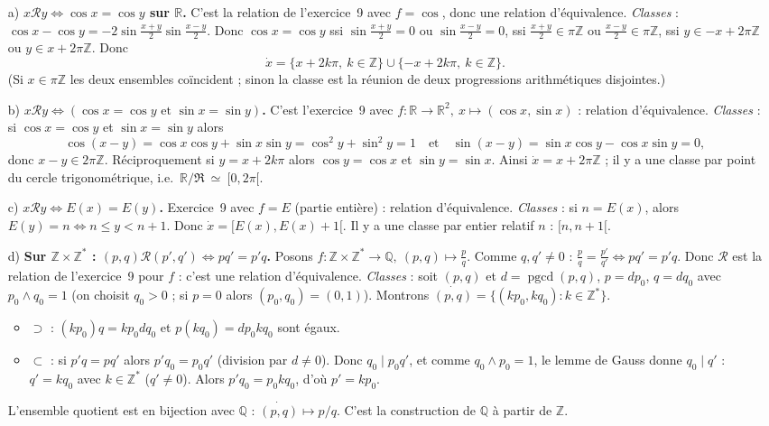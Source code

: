 \documentclass[11pt,a4paper]{article}
\newcommand{\R}{\mathbb{R}}\newcommand{\N}{\mathbb{N}}\newcommand{\Z}{\mathbb{Z}}
\newcommand{\Q}{\mathbb{Q}}\newcommand{\C}{\mathbb{C}}
\newcommand{\pgcd}{\operatorname{pgcd}}
\newcommand{\eqv}{\mathfrak{R}}
\begin{document}
	\begin{corrige}
		\begin{enumerate}
			\item[a)] \textbf{$x\mathcal Ry\iff\cos x=\cos y$ sur $\R$.} C'est la relation de l'exercice~9 avec $f=\cos$, donc une relation d'équivalence. \emph{Classes} : $\cos x-\cos y=-2\sin\frac{x+y}2\sin\frac{x-y}2$. Donc $\cos x=\cos y$ ssi $\sin\frac{x+y}2=0$ ou $\sin\frac{x-y}2=0$, ssi $\frac{x+y}2\in\pi\Z$ ou $\frac{x-y}2\in\pi\Z$, ssi $y\in-x+2\pi\Z$ ou $y\in x+2\pi\Z$. Donc
			$$\dot x=\{x+2k\pi,\ k\in\Z\}\cup\{-x+2k\pi,\ k\in\Z\}.$$
			(Si $x\in\pi\Z$ les deux ensembles coïncident ; sinon la classe est la réunion de deux progressions arithmétiques disjointes.)
			\item[b)] \textbf{$x\mathcal Ry\iff(\cos x=\cos y\text{ et }\sin x=\sin y)$.} C'est l'exercice~9 avec $f:\R\to\R^2,\ x\mapsto(\cos x,\sin x)$ : relation d'équivalence. \emph{Classes} : si $\cos x=\cos y$ et $\sin x=\sin y$ alors
			$$\cos(x-y)=\cos x\cos y+\sin x\sin y=\cos^2y+\sin^2y=1\quad\text{et}\quad\sin(x-y)=\sin x\cos y-\cos x\sin y=0,$$
			donc $x-y\in2\pi\Z$. Réciproquement si $y=x+2k\pi$ alors $\cos y=\cos x$ et $\sin y=\sin x$. Ainsi $\dot x=x+2\pi\Z$ ; il y a une classe par point du cercle trigonométrique, i.e.\ $\R/\!\eqv\ \simeq\ [0,2\pi[$.
			\item[c)] \textbf{$x\mathcal Ry\iff E(x)=E(y)$.} Exercice~9 avec $f=E$ (partie entière) : relation d'équivalence. \emph{Classes} : si $n=E(x)$, alors $E(y)=n\iff n\leq y<n+1$. Donc $\dot x=[E(x),E(x)+1[$. Il y a une classe par entier relatif $n$ : $[n,n+1[$.
			\item[d)] \textbf{Sur $\Z\times\Z^*$ : $(p,q)\mathcal R(p',q')\iff pq'=p'q$.} Posons $f:\Z\times\Z^*\to\Q,\ (p,q)\mapsto\frac pq$. Comme $q,q'\neq0$ : $\frac pq=\frac{p'}{q'}\iff pq'=p'q$. Donc $\mathcal R$ est la relation de l'exercice~9 pour $f$ : c'est une relation d'équivalence. \emph{Classes} : soit $(p,q)$ et $d=\pgcd(p,q)$, $p=dp_0$, $q=dq_0$ avec $p_0\wedge q_0=1$ (on choisit $q_0>0$ ; si $p=0$ alors $(p_0,q_0)=(0,1)$). Montrons $\dot{(p,q)}=\{(kp_0,kq_0):k\in\Z^*\}$.
			\begin{itemize}
				\item $\supset$ : $(kp_0)q=kp_0dq_0$ et $p(kq_0)=dp_0kq_0$ sont égaux.
				\item $\subset$ : si $p'q=pq'$ alors $p'q_0=p_0q'$ (division par $d\neq0$). Donc $q_0\mid p_0q'$, et comme $q_0\wedge p_0=1$, le lemme de Gauss donne $q_0\mid q'$ : $q'=kq_0$ avec $k\in\Z^*$ ($q'\neq0$). Alors $p'q_0=p_0kq_0$, d'où $p'=kp_0$.
			\end{itemize}
			L'ensemble quotient est en bijection avec $\Q$ : $\dot{(p,q)}\mapsto p/q$. C'est la construction de $\Q$ à partir de $\Z$.
		\end{enumerate}
	\end{corrige}
	
\end{document}
